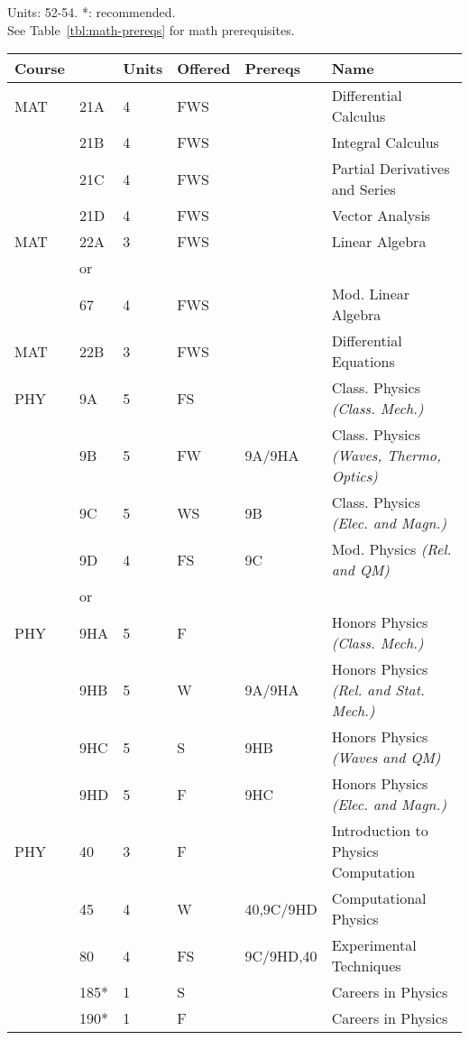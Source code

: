 \documentclass[12pt]{article}
\begin{document}
\newpage
\vskip 2cm
\vskip 0.25cm
\noindent
Units:  52-54. *: recommended.\\
See Table~\ref{tbl:math-prereqs} for math prerequisites.\\
\begin{tabular}{|llllll|}
\hline
Course & & Units & Offered & Prereqs & Name \\
\hline
MAT & 21A & 4 & FWS & & Differential Calculus\\ 
    & 21B & 4 & FWS &  & Integral Calculus \\ 
    & 21C & 4 & FWS &  & Partial Derivatives and Series\\ 
    & 21D & 4 & FWS &  & Vector Analysis\\
\hline
MAT & 22A & 3 & FWS &  & Linear Algebra\\
    & or  & & & & \\
    & 67  & 4 & FWS &  & Mod. Linear Algebra\\
\hline
MAT & 22B & 3 & FWS &  & Differential Equations\\ 
\hline
\hline

PHY & 9A & 5 & FS &  & Class. Physics {\it (Class. Mech.)}\\
& 9B & 5 & FW & 9A/9HA    & Class. Physics {\it (Waves, Thermo, Optics)}\\
    & 9C & 5 & WS & 9B  & Class. Physics {\it (Elec. and Magn.)}\\ 
    & 9D & 4 & FS & 9C & Mod. Physics {\it (Rel. and QM)}\\ 
\hline
&or&&\\
\hline
PHY & 9HA & 5 & F &  & Honors Physics {\it (Class. Mech.)}\\ 
    & 9HB & 5 & W & 9A/9HA  & Honors Physics {\it (Rel. and Stat. Mech.)}\\ 
    & 9HC & 5 & S & 9HB  & Honors Physics {\it (Waves and QM)}\\ 
    & 9HD & 5 & F & 9HC   & Honors Physics {\it (Elec. and Magn.)}\\ 
\hline
\hline
PHY & 40  & 3 & F & & Introduction to Physics Computation \\ 
    & 45  & 4 & W & 40,9C/9HD & Computational Physics\\ 
    & 80  & 4 & FS & 9C/9HD,40        & Experimental Techniques \\
    & 185* & 1 & S & & Careers in Physics \\ 
    & 190* & 1 & F & & Careers in Physics \\ 
\hline
\end{tabular}\\
\end{document}
